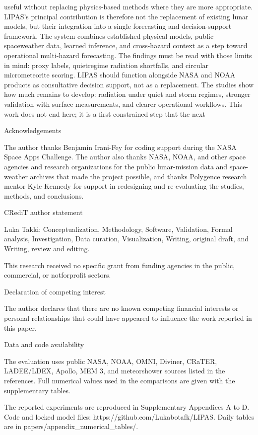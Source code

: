 useful without replacing physics-based methods where they are more appropriate. LIPAS's principal contribution is therefore not the replacement of existing lunar models, but their integration into a single forecasting and decision-support framework. The system combines established physical models, public spaceweather data, learned inference, and cross-hazard context as a step toward operational multi-hazard forecasting. The findings must be read with those limits in mind: proxy labels, quietregime radiation shortfalls, and circular micrometeorite scoring. LIPAS should function alongside NASA and NOAA products as consultative decision support, not as a replacement. The studies show how much remains to develop: radiation under quiet and storm regimes, stronger validation with surface measurements, and clearer operational workflows. This work does not end here; it is a first constrained step that the next

Acknowledgements

The author thanks Benjamin Irani-Fey for coding support during the NASA Space Apps Challenge. The author also thanks NASA, NOAA, and other space agencies and research organizations for the public lunar-mission data and space-weather archives that made the project possible, and thanks Polygence research mentor Kyle Kennedy for support in redesigning and re-evaluating the studies, methods, and conclusions.

CRediT author statement

Luka Takki: Conceptualization, Methodology, Software, Validation, Formal analysis, Investigation, Data curation, Visualization, Writing, original draft, and Writing, review and editing.

This research received no specific grant from funding agencies in the public, commercial, or notforprofit sectors.

Declaration of competing interest

The author declares that there are no known competing financial interests or personal relationships that could have appeared to influence the work reported in this paper.

Data and code availability

The evaluation uses public NASA, NOAA, OMNI, Diviner, CRaTER, LADEE/LDEX, Apollo, MEM 3, and meteorshower sources listed in the references. Full numerical values used in the comparisons are given with the supplementary tables.

The reported experiments are reproduced in Supplementary Appendices A to D. Code and locked model files: https://github.com/Lukabotafk/LIPAS. Daily tables are in papers/appendix\_numerical\_tables/.

